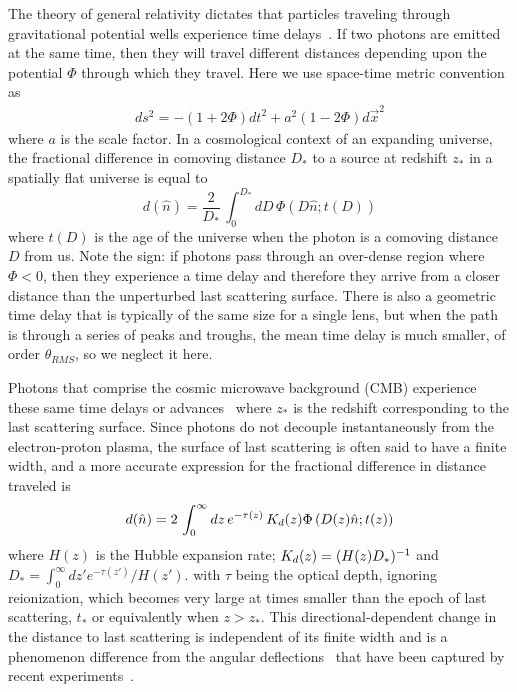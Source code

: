 \documentclass[prl,amsmath,amssymb,floatfix,superscriptaddress,nofootinbib,twocolumn]{revtex4-1}
\def\be{\begin{equation}}
\def\ee{\end{equation}}
\def\bea{\begin{eqnarray}}
\def\eea{\end{eqnarray}}
\newcommand{\wh}[1]{{\color{red} WH: #1}}
\begin{document}
The theory of general relativity dictates that particles traveling through gravitational potential wells experience time delays~\cite{1964PhRvL..13..789S}. If two photons are emitted at the same time, then they will travel different distances depending upon the potential $\Phi$ through which they travel. Here we use space-time metric convention as 
\bea
ds^{2}= -(1+2\Phi)dt^{2}+a^{2}(1-2\Phi)d\vec{x}^{2}
\eea
where $a$ is the scale factor. In a cosmological context of an expanding universe, the %
fractional difference in comoving distance
$D_*$ to a source at redshift $z_*$ in a spatially flat universe is equal to
\be
d(\hat n) = \frac{2}{D_*}\, \int_0^{D_*} dD\, \Phi\left(D \hat n; t(D)\right)
\ee
where %
$t(D)$ is the age of the universe when the photon is a comoving distance $D$ from us. Note the sign: if photons pass through an over-dense region where $\Phi<0$, then they experience a time delay and therefore they arrive from a closer distance than the unperturbed last scattering surface. There is also a geometric time delay that is typically of the same size for a single lens, but when the path is through a series of peaks and troughs, the mean time delay is much smaller, of order $\theta_{RMS}$, so we neglect it here. 

Photons that comprise the cosmic microwave background (CMB) experience these same time delays or advances~\cite{Hu:2001yq} where $z_*$ is the redshift corresponding to the last scattering surface. Since photons do not decouple instantaneously from the electron-proton plasma, the surface of last scattering is often said to have a finite width, and a more accurate expression for the fractional difference in distance traveled is
\be
\fd(\hat n) = 2\, \int_0^{\infty} dz \, e^{-\tau(z)}\, K_\fd(z)\Phi\left(D(z)\hat n; t(z)\right)
\ee
where $H(z)$ is the Hubble expansion rate; $K_d(z) =  (H(z)D_*)^{-1}$ and $D_* =  \int_0^\infty dz' e^{-\tau(z') }/H(z')$.
with $\tau$ being the optical depth, ignoring reionization, which becomes very large at times smaller than the epoch of  last scattering, $t_*$ or equivalently when $z>z_*$.
This directional-dependent change in the distance to last scattering is independent of its finite width and is a phenomenon difference from the angular deflections~\cite{Hu:2001tn,Lewis:2006fu} that have been captured by recent experiments~\cite{Smith:2007rg,Ade:2013tyw,Story:2014hni,Sherwin:2016tyf,Aghanim:2018oex}.
\end{document}

